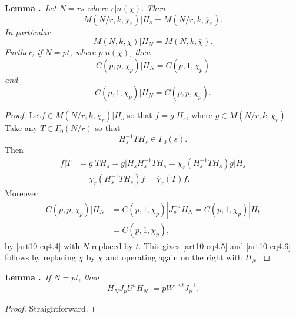 \medskip
\noindent
{\bf Lemma .\label{art10-lem4.1}}~{\em Let $N=rs$ where $r|n(\chi)$. Then}
\begin{equation}
M(N/r,k,\chi_{r})|H_{s}=M(N/r,k,\overline{\chi}_{r}).\label{art10-eq4.3}
\end{equation}
{\em In particular}
\begin{equation}
M(N,k,\chi)| H_{N}=M(N,k,\overline{\chi}).\label{art10-eq4.4}
\end{equation}
{\em Further, if $N=pt$, where $p|n(\chi)$, then}
\begin{equation}
C(p,p,\chi_{p})|H_{N}=C(p,1,\overline{\chi}_{p})\label{art10-eq4.5}
\end{equation}
{\em and}
\begin{equation}
C(p,1,\chi_{p})|H_{N}=C(p,p,\overline{\chi}_{p}).\label{art10-eq4.6}
\end{equation}

\begin{proof}
Let\pageoriginale $f\in M(N/r,k,\chi_{r})|H_{s}$ so that $f=g|H_{s}$, where $g\in M(N/r,k,\chi_{r})$. Take any $T\in \Gamma_{0}(N/r)$ so that
$$
H^{-1}_{s}TH_{s}\in \Gamma_{0}(s).
$$
Then 
\begin{align*}
f|T &= g|TH_{s}=g|H_{s}H_{s}^{-1}TH_{s}=\chi_{r}(H^{-1}_{s}TH_{s})g|H_{s}\\[3pt]
&= \chi_{r}(H^{-1}_{s}TH_{s})f=\overline{\chi}_{r}(T)f.
\end{align*}
Moreover
\begin{align*}
C(p,p,\chi_{p})|H_{N} &= C(p,1,\chi_{p})|J^{-1}_{p}H_{N}=C(p,1,\chi_{p})|H_{t}\\[3pt]
&= C(p,1,\chi_{p}),
\end{align*}
by \eqref{art10-eq4.4} with $N$ replaced by $t$. This gives \eqref{art10-eq4.5} and \eqref{art10-eq4.6} follows by replacing $\chi$ by $\overline{\chi}$ and operating again on the right with $H_{N}$.
\end{proof}

\medskip
\noindent
{\bf Lemma .\label{art10-lem4.2}}~{\em If $N=pt$, then}
\begin{equation}
H_{N}J_{p}U^{u}H^{-1}_{N}=pW^{-ut}J_{p}^{-1}.\label{art10-lem4.7}
\end{equation}

\begin{proof}
Straightforward.
\end{proof}

